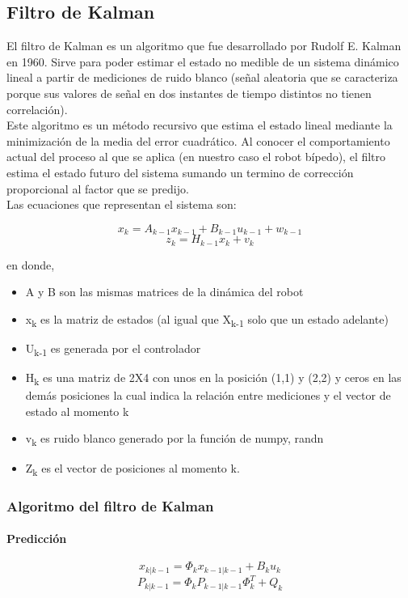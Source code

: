 \documentclass[10pt]{article}
\begin{document}
\subsection{Filtro de Kalman}
El filtro de Kalman es un algoritmo que fue desarrollado por Rudolf E. Kalman en 1960. Sirve para poder estimar el estado no medible de un sistema dinámico lineal a partir de mediciones de ruido blanco (señal aleatoria que se caracteriza porque sus valores de señal en dos instantes de tiempo distintos no tienen correlación).\\
Este algoritmo es un método recursivo que estima el estado lineal mediante la minimización de la media del error cuadrático.  Al conocer el comportamiento actual del proceso al que se aplica (en nuestro caso el robot bípedo), el filtro estima el estado futuro del sistema sumando un termino de corrección proporcional al factor que se predijo.\\
Las ecuaciones que representan el sistema son:
\begin{center}
\begin{equation}
x_k = A_{k-1} x_{k-1} + B_{k-1} u_{k-1} + w_{k-1}
\end{equation}
\begin{equation}
z_k = H_{k-1} x_{k} + v_{k}
\end{equation}
\end{center}
en donde,
\begin{itemize}
\item A y B son las mismas matrices de la dinámica del robot
\item x\textsubscript{k} es la matriz de estados (al igual que X\textsubscript{k-1} solo que un estado adelante)
\item U\textsubscript{k-1} es generada por el controlador
\item H\textsubscript{k} es una matriz de 2X4 con unos en la posición (1,1) y (2,2) y ceros en las demás posiciones  la cual indica la relación entre mediciones y el vector de estado al momento k
\item v\textsubscript{k} es ruido blanco generado por la función de numpy, randn
\item Z\textsubscript{k} es el vector de posiciones al momento k.
\end{itemize}
\subsubsection{Algoritmo del filtro de Kalman}
\paragraph{Predicción}
\begin{center}
\begin{equation}
x_{k|k-1} = \Phi_k x_{k-1|k-1} + B_k u_k
\end{equation}
\begin{equation}
P_{k|k-1} = \Phi_k P_{k-1|k-1} \Phi_k ^ T + Q_k
\end{equation}
\end{center}
\end{document}

